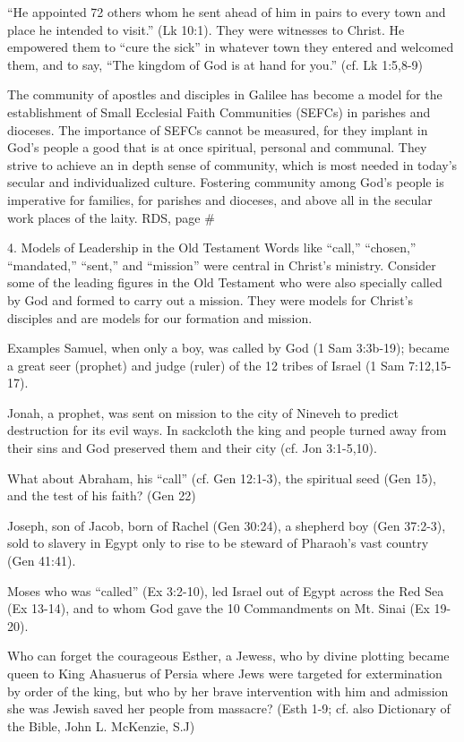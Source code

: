 \documentclass[oneside]{book}
\begin{document}
``He appointed 72 others whom he sent ahead of him in pairs to every town and
place he intended to visit.'' (Lk 10:1). They were witnesses to Christ. He
empowered them to ``cure the sick'' in whatever town they entered and welcomed
them, and to say, ``The kingdom of God is at hand for you.'' (cf. Lk 1:5,8-9)

The community of apostles and disciples in Galilee has become a model for the
establishment of Small Ecclesial Faith Communities (SEFCs) in parishes and
dioceses. The importance of SEFCs cannot be measured, for they implant in God's
people a good that is at once spiritual, personal and communal. They strive to
achieve an in depth sense of community, which is most needed in today's secular
and individualized culture. Fostering community among God's people is imperative
for families, for parishes and dioceses, and above all in the secular work
places of the laity.
RDS, page \#

4. Models of Leadership in the Old Testament
Words like ``call,'' ``chosen,'' ``mandated,'' ``sent,'' and ``mission'' were
central in Christ's ministry. Consider some of the leading figures in the Old
Testament who were also specially called by God and formed to carry out a
mission. They were models for Christ's disciples and are models for our
formation and mission.

Examples
Samuel, when only a boy, was called by God (1 Sam 3:3b-19); became a great seer
(prophet) and judge (ruler) of the 12 tribes of Israel (1 Sam 7:12,15-17).

Jonah, a prophet, was sent on mission to the city of Nineveh to predict
destruction for its evil ways. In sackcloth the king and people turned away from
their sins and God preserved them and their city (cf. Jon 3:1-5,10).

What about Abraham, his ``call'' (cf. Gen 12:1-3), the spiritual seed (Gen 15),
and the test of his faith? (Gen 22)

Joseph, son of Jacob, born of Rachel (Gen 30:24), a shepherd boy (Gen 37:2-3),
sold to slavery in Egypt only to rise to be steward of Pharaoh's vast country
(Gen 41:41).

Moses who was ``called'' (Ex 3:2-10), led Israel out of Egypt across the Red Sea
(Ex 13-14), and to whom God gave the 10 Commandments on Mt. Sinai (Ex 19-20).

Who can forget the courageous Esther, a Jewess, who by divine plotting became
queen to King Ahasuerus of Persia where Jews were targeted for extermination by
order of the king, but who by her brave intervention with him and admission she
was Jewish saved her people from massacre? (Esth 1-9; cf. also Dictionary of the
Bible, John L. McKenzie, S.J)
\end{document}
